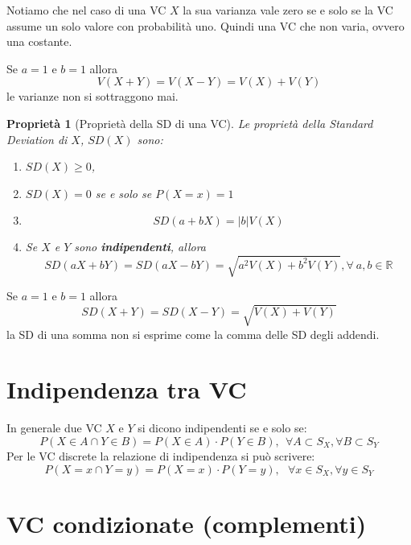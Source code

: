 \documentclass[
  11pt,
]{book}
\providecommand{\tightlist}{%
  \setlength{\itemsep}{0pt}\setlength{\parskip}{0pt}}
\theoremstyle{mytheoremstyle}
\newtheorem{proposition}{Proprietà}[section]
\theoremstyle{mydefstyle}
\newenvironment{att}
  {
\begin{tcolorbox}[enhanced,arc=0.1mm,boxrule=1pt,colback=white,colframe=ared,title=\bf\small \fontfamily{lmss}\selectfont \faExclamationTriangle \hspace{.5 cm} Attenzione,drop fuzzy shadow]
}{
\end{tcolorbox}
  }
\begin{document}
Notiamo che nel caso di una VC \(X\) la sua varianza vale zero se e solo se la VC
assume un solo valore con probabilità uno. Quindi una VC che non varia, ovvero una costante.

\begin{att}
Se \(a=1\) e \(b=1\) allora \[V(X+Y)=V(X-Y)=V(X)+V(Y)\]
le varianze non si sottraggono mai.

\end{att}

\begin{info}

\begin{proposition}[Proprietà della SD di una VC]

Le proprietà della Standard Deviation di \(X\), \(SD(X)\) sono:

\begin{enumerate}
\def\labelenumi{\arabic{enumi}.}
\tightlist
\item
  \(SD(X)\geq 0\),
\item
  \(SD(X)=0\) se e solo se \(P(X=x)=1\)
\item
  \[SD(a+bX)=|b|V(X)\]
\item
  Se \(X\) e \(Y\) sono \textbf{indipendenti}, allora \[SD(aX+bY)=SD(aX-bY)=\sqrt{a^2V(X)+b^2V(Y)}, \forall~a,b\in\mathbb{R}\]
\end{enumerate}

\end{proposition}

\end{info}

\begin{att}
Se \(a=1\) e \(b=1\) allora \[SD(X+Y)=SD(X-Y)=\sqrt{V(X)+V(Y)}\]
la SD di una somma non si esprime come la comma delle SD degli addendi.

\end{att}

\section{Indipendenza tra VC}\label{indipendenza-tra-vc}

In generale due VC \(X\) e \(Y\) si dicono indipendenti se e solo se: \[P(X\in A\cap Y\in B)=P(X\in A)\cdot P(Y\in B),~~\forall A \subset S_X,\forall B \subset S_Y\] Per le VC discrete la relazione di indipendenza si può scrivere: \[P(X=x\cap Y=y)=P(X=x)\cdot P(Y=y),~~~\forall x \in S_X,\forall y \in S_Y\]

\section{VC condizionate (complementi)}\label{vc-condizionate-complementi}
\end{document}
